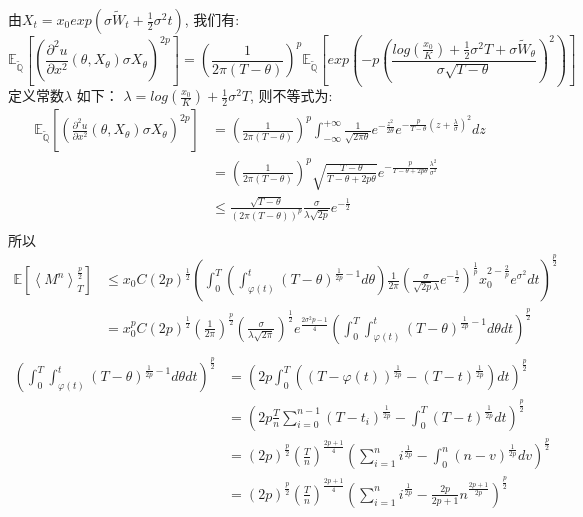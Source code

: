 由$X_t=x_0exp(\sigma \widetilde{W}_t+\frac{1}{2}\sigma^2t)$, 我们有:
\begin{equation}
\mathbb{E}_{\widetilde{\mathbb{Q}}}[ (\frac{\partial^2 u}{\partial x^2}(\theta, X_\theta)\sigma X_\theta)^{2p}]
=(\frac{1}{2\pi(T-\theta)})^p\mathbb{E}_{\widetilde{\mathbb{Q}}}[exp(-p(\frac{log(\frac{x_0}{K})+\frac{1}{2}\sigma^2T+\sigma\widetilde{W}_{\theta}}{\sigma\sqrt{T-\theta}})^2)]
\end{equation}
定义常数$\lambda$ 如下： $\lambda=log(\frac{x_0}{K})+\frac{1}{2}\sigma^2T$, 则不等式为:
\begin{equation}
\begin{split}
\mathbb{E}_{\widetilde{\mathbb{Q}}}[ (\frac{\partial^2 u}{\partial x^2}(\theta, X_\theta)\sigma X_\theta)^{2p}]
&=(\frac{1}{2\pi(T-\theta)})^p\int^{+\infty}_{-\infty}\frac{1}{\sqrt{2\pi\theta}}e^{-\frac{z^2}{2\theta}}e^{-\frac{p}{T-\theta}(z+\frac{\lambda}{\sigma})^2}dz\\
&=(\frac{1}{2\pi(T-\theta)})^p\sqrt{\frac{T-\theta}{T-\theta+2p\theta}}e^{-\frac{p}{T-\theta+2p\theta}\frac{\lambda^2}{\sigma^2}}\\
&\leq \frac{\sqrt{T-\theta}}{(2\pi(T-\theta))^p}\frac{\sigma}{\lambda\sqrt{2p}}e^{-\frac{1}{2}}\\
\end{split}
\end{equation}
所以 
\begin{equation}
\begin{split}
\mathbb{E}[\left \langle M^n \right \rangle_T^{\frac{p}{2}}]&\leq
 x_0C(2p)^{\frac{1}{2}}(\int_0^T(\int_{\varphi(t)}^t (T-\theta)^{\frac{1}{2p}-1} d\theta)\frac{1}{2\pi}(\frac{\sigma}{\sqrt{2p}\lambda}e^{-\frac{1}{2}})^{\frac{1}{p}}x_0^{2-\frac{2}{p}}e^{\sigma^2}dt)^{\frac{p}{2}}\\
 &=x_0^pC(2p)^{\frac{1}{2}}(\frac{1}{2\pi})^{\frac{p}{2}}(\frac{\sigma}{\lambda\sqrt{2\pi}})^{\frac{1}{2}}e^{\frac{2\sigma^2p-1}{4}}
 (\int_0^T\int_{\varphi(t)}^t (T-\theta)^{\frac{1}{2p}-1} d\theta dt)^{\frac{p}{2}}\\
 \end{split}
 \end{equation}
 \begin{equation}
 \begin{split}
 (\int_0^T\int_{\varphi(t)}^t (T-\theta)^{\frac{1}{2p}-1} d\theta dt)^{\frac{p}{2}}
 &=(2p\int_0^T((T-\varphi(t))^{\frac{1}{2p}}-(T-t)^{\frac{1}{2p}}) dt)^{\frac{p}{2}}\\
 &=(2p\frac{T}{n}\sum_{i=0}^{n-1}(T-t_i)^{\frac{1}{2p}}-\int_0^T(T-t)^{\frac{1}{2p}} dt)^{\frac{p}{2}}\\
 &=(2p)^{\frac{p}{2}}(\frac{T}{n})^{\frac{2p+1}{4}}(\sum_{i=1}^{n}i^{\frac{1}{2p}}-\int_0^n(n-v)^{\frac{1}{2p}} dv)^{\frac{p}{2}}\\
 &=(2p)^{\frac{p}{2}}(\frac{T}{n})^{\frac{2p+1}{4}}(\sum_{i=1}^{n}i^{\frac{1}{2p}}-\frac{2p}{2p+1}n^{\frac{2p+1}{2p}})^{\frac{p}{2}}\\
 \end{split}
 \end{equation}
